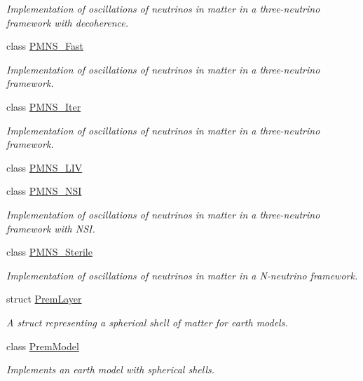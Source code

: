 \begin{DoxyCompactItemize}
\begin{DoxyCompactList}\small\item\em Implementation of oscillations of neutrinos in matter in a three-\/neutrino framework with decoherence. \end{DoxyCompactList}\item 
class \hyperlink{classOscProb_1_1PMNS__Fast}{P\+M\+N\+S\+\_\+\+Fast}
\begin{DoxyCompactList}\small\item\em Implementation of oscillations of neutrinos in matter in a three-\/neutrino framework. \end{DoxyCompactList}\item 
class \hyperlink{classOscProb_1_1PMNS__Iter}{P\+M\+N\+S\+\_\+\+Iter}
\begin{DoxyCompactList}\small\item\em Implementation of oscillations of neutrinos in matter in a three-\/neutrino framework. \end{DoxyCompactList}\item 
class \hyperlink{classOscProb_1_1PMNS__LIV}{P\+M\+N\+S\+\_\+\+L\+IV}
\item 
class \hyperlink{classOscProb_1_1PMNS__NSI}{P\+M\+N\+S\+\_\+\+N\+SI}
\begin{DoxyCompactList}\small\item\em Implementation of oscillations of neutrinos in matter in a three-\/neutrino framework with N\+SI. \end{DoxyCompactList}\item 
class \hyperlink{classOscProb_1_1PMNS__Sterile}{P\+M\+N\+S\+\_\+\+Sterile}
\begin{DoxyCompactList}\small\item\em Implementation of oscillations of neutrinos in matter in a N-\/neutrino framework. \end{DoxyCompactList}\item 
struct \hyperlink{structOscProb_1_1PremLayer}{Prem\+Layer}
\begin{DoxyCompactList}\small\item\em A struct representing a spherical shell of matter for earth models. \end{DoxyCompactList}\item 
class \hyperlink{classOscProb_1_1PremModel}{Prem\+Model}
\begin{DoxyCompactList}\small\item\em Implements an earth model with spherical shells. \end{DoxyCompactList}\end{DoxyCompactItemize}
